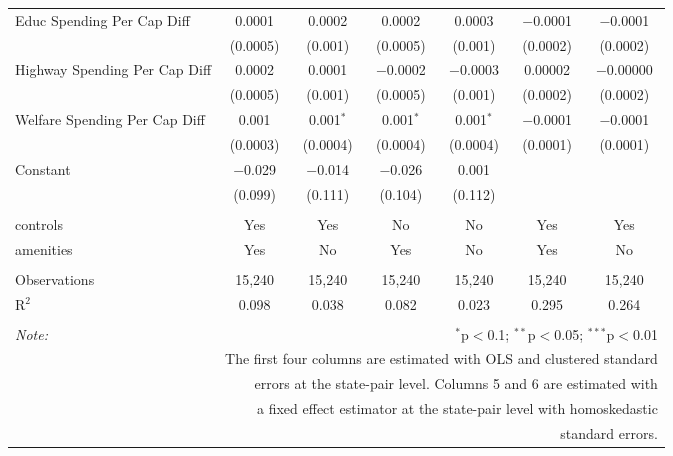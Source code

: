 \begin{table}[!htbp]
\begin{tabular}{@{\extracolsep{5pt}}lcccccc}
  Educ Spending Per Cap Diff & 0.0001 & 0.0002 & 0.0002 & 0.0003 & $-$0.0001 & $-$0.0001 \\ 
  & (0.0005) & (0.001) & (0.0005) & (0.001) & (0.0002) & (0.0002) \\ 
  Highway Spending Per Cap Diff & 0.0002 & 0.0001 & $-$0.0002 & $-$0.0003 & 0.00002 & $-$0.00000 \\ 
  & (0.0005) & (0.001) & (0.0005) & (0.001) & (0.0002) & (0.0002) \\ 
  Welfare Spending Per Cap Diff & 0.001 & 0.001$^{*}$ & 0.001$^{*}$ & 0.001$^{*}$ & $-$0.0001 & $-$0.0001 \\ 
  & (0.0003) & (0.0004) & (0.0004) & (0.0004) & (0.0001) & (0.0001) \\ 
  Constant & $-$0.029 & $-$0.014 & $-$0.026 & 0.001 &  &  \\ 
  & (0.099) & (0.111) & (0.104) & (0.112) &  &  \\ 
 \hline \\[-1.8ex] 
controls & Yes & Yes & No & No & Yes & Yes \\ 
amenities & Yes & No & Yes & No & Yes & No \\ 
\hline \\[-1.8ex] 
Observations & 15,240 & 15,240 & 15,240 & 15,240 & 15,240 & 15,240 \\ 
R$^{2}$ & 0.098 & 0.038 & 0.082 & 0.023 & 0.295 & 0.264 \\ 
\hline 
\hline \\[-1.8ex] 
\textit{Note:}  & \multicolumn{6}{r}{$^{*}$p$<$0.1; $^{**}$p$<$0.05; $^{***}$p$<$0.01} \\ 
 & \multicolumn{6}{r}{The first four columns are estimated with OLS and clustered standard} \\ 
 & \multicolumn{6}{r}{ errors at the state-pair level. Columns 5 and 6 are estimated with} \\ 
 & \multicolumn{6}{r}{a fixed effect estimator at the state-pair level with homoskedastic} \\ 
 & \multicolumn{6}{r}{standard errors.} \\ 
\end{tabular} 
\end{table} 
